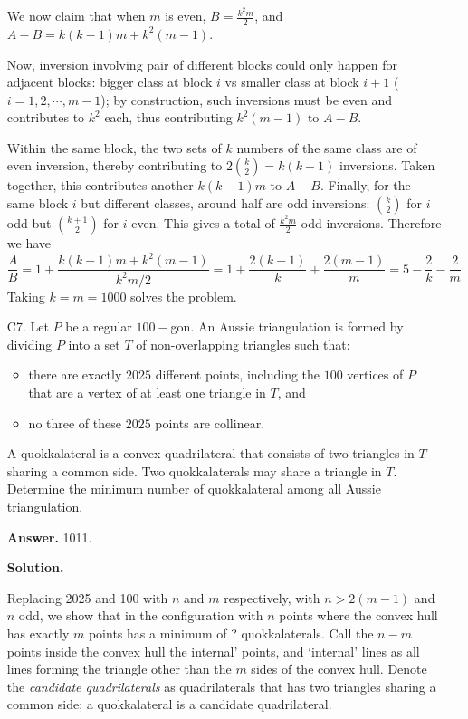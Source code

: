 \documentclass[11pt,a4paper]{article}
\begin{document}
\begin{enumerate}
        We now claim that when $m$ is even, $B = \frac{k^2m}{2}$, 
        and $A - B = k(k-1)m + k^2(m-1)$. 
        
        Now, inversion involving pair of different blocks could only happen for adjacent blocks: bigger class at block $i$ vs smaller class at block $i + 1$ ($i=1, 2, \cdots, m - 1$); 
        by construction, such inversions must be even and contributes to $k^2$ each, thus contributing $k^2(m-1)$ to $A-B$. 
        
        Within the same block, the two sets of $k$ numbers of the same class are of even inversion, thereby contributing to $2\binom{k}{2}=k(k-1)$ inversions. 
        Taken together, this contributes another $k(k-1)m$ to $A-B$. 
        Finally, for the same block $i$ but different classes, 
        around half are odd inversions: 
        $\binom{k}{2}$ for $i$ odd but $\binom{k+1}{2}$ for $i$ even. 
        This gives a total of $\frac{k^2m}{2}$ odd inversions. 
        Therefore we have 
        \[
        \frac{A}{B}
        = 1 + \frac{k(k-1)m + k^2(m-1)}{k^2m/2}
        = 1 + \frac{2(k-1)}{k} + \frac{2(m-1)}{m}
        = 5 - \frac{2}{k} - \frac{2}{m}
        \]
        Taking $k = m = 1000$ solves the problem. 
    	
    	\item [C7.]
    	Let $P$ be a regular $100-$gon. An Aussie triangulation is formed by dividing $P$ into a set $T$ of non-overlapping triangles such that:
    	\begin{itemize}
    	\item there are exactly $2025$ different points, including the $100$ vertices of $P$ that are a vertex of at least one triangle in $T$, and
    	
    	\item no three of these $2025$ points are collinear.
    	\end{itemize}
    	A quokkalateral is a convex quadrilateral that consists of two triangles in $T$ sharing a common side. Two quokkalaterals may share a triangle in $T$. Determine the minimum number of quokkalateral among all Aussie triangulation.
    	
    	\textbf{Answer.}  1011. 
    	
    	\textbf{Solution.} 
    	
    	Replacing 2025 and 100 with $n$ and $m$ respectively, with $n > 2(m - 1)$ and $n$ odd, we show that in the configuration with $n$ points where the convex hull has exactly $m$ points has a minimum of ? quokkalaterals. 
    	Call the $n - m$ points inside the convex hull the 	internal' points, and `internal' lines as all lines forming the triangle other than the $m$ sides of the convex hull. 
    	Denote the \textit{candidate quadrilaterals} as quadrilaterals that has two triangles sharing a common side; 
    	a quokkalateral is a candidate quadrilateral. 
    	

\end{enumerate}
\end{document}
